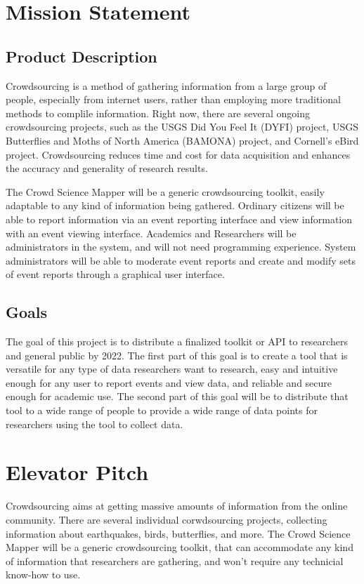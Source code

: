 
\section{Mission Statement}
\subsection{Product Description}

Crowdsourcing is a method of gathering information from a large group of people, especially from internet users, rather than employing more traditional methods to complile information. Right now, there are several ongoing crowdsourcing projects, such as the USGS Did You Feel It (DYFI) project, USGS Butterflies and Moths of North America (BAMONA) project, and Cornell’s eBird project. Crowdsourcing reduces time and cost for data acquisition and enhances the accuracy and generality of research results.

The Crowd Science Mapper will be a generic crowdsourcing toolkit, easily adaptable to any kind of information being gathered. Ordinary citizens will be able to report information via an event reporting interface and view information with an event viewing interface. Academics and Researchers will be administrators in the system, and will not need programming experience. System administrators will be able to moderate event reports and create and modify sets of event reports through a graphical user interface. 

\subsection{Goals}
The goal of this project is to distribute a finalized toolkit or API to researchers and general public by 2022. The first part of this goal is to create a tool that is versatile for any type of data researchers want to research, easy and intuitive enough for any user to report events and view data, and reliable and secure enough for academic use. The second part of this goal will be to distribute that tool to a wide range of people to provide a wide range of data points for researchers using the tool to collect data. 

\section{Elevator Pitch}
Crowdsourcing aims at getting massive amounts of information from the online community. There are several individual corwdsourcing projects, collecting information about earthquakes, birds, butterflies, and more. The Crowd Science Mapper will be a generic crowdsourcing toolkit, that can accommodate any kind of information that researchers are gathering, and won't require any technicial know-how to use. 